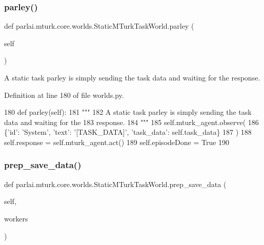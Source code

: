 \subsubsection{\texorpdfstring{parley()}{parley()}}
{\footnotesize\ttfamily def parlai.\+mturk.\+core.\+worlds.\+Static\+M\+Turk\+Task\+World.\+parley (\begin{DoxyParamCaption}\item[{}]{self }\end{DoxyParamCaption})}

\begin{DoxyVerb}A static task parley is simply sending the task data and waiting for the
response.
\end{DoxyVerb}
 

Definition at line 180 of file worlds.\+py.


\begin{DoxyCode}
180     \textcolor{keyword}{def }parley(self):
181         \textcolor{stringliteral}{"""}
182 \textcolor{stringliteral}{        A static task parley is simply sending the task data and waiting for the}
183 \textcolor{stringliteral}{        response.}
184 \textcolor{stringliteral}{        """}
185         self.mturk\_agent.observe(
186             \{\textcolor{stringliteral}{'id'}: \textcolor{stringliteral}{'System'}, \textcolor{stringliteral}{'text'}: \textcolor{stringliteral}{'[TASK\_DATA]'}, \textcolor{stringliteral}{'task\_data'}: self.task\_data\}
187         )
188         self.response = self.mturk\_agent.act()
189         self.episodeDone = \textcolor{keyword}{True}
190 
\end{DoxyCode}
\mbox{\label{classparlai_1_1mturk_1_1core_1_1worlds_1_1StaticMTurkTaskWorld_a38d3d55c327426feb97d42c42c5cb49e}} 
\subsubsection{\texorpdfstring{prep\+\_\+save\+\_\+data()}{prep\_save\_data()}}
{\footnotesize\ttfamily def parlai.\+mturk.\+core.\+worlds.\+Static\+M\+Turk\+Task\+World.\+prep\+\_\+save\+\_\+data (\begin{DoxyParamCaption}\item[{}]{self,  }\item[{}]{workers }\end{DoxyParamCaption})}


